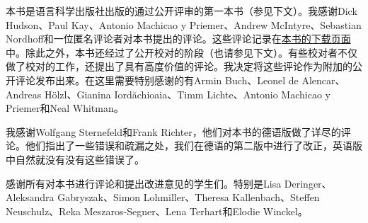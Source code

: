 
本书是语言科学出版社出版的通过公开评审的第一本书（参见下文）。我感谢Dick Hudson、Paul Kay、Antonio Machicao y Priemer、Andrew McIntyre、Sebastian Nordhoff和一位匿名评论者对本书提出的评论。这些评论记录在\href{\lsURL}{本书的下载页面}中。除此之外，本书还经过了公开校对的阶段（也请参见下文）。有些校对者不仅做了校对的工作，还提出了具有高度价值的评论。我决定将这些评论作为附加的公开评论发布出来。在这里需要特别感谢的有Armin Buch、Leonel de Alencar、Andreas Hölzl、Gianina Iordăchioaia、Timm Lichte、Antonio Machicao y Priemer和Neal Whitman。

我感谢Wolfgang Sternefeld和Frank Richter，他们对本书的德语版做了详尽的评论。他们指出了一些错误和疏漏之处，我们在德语的第二版中进行了改正，英语版中自然就没有没有这些错误了。

感谢所有对本书进行评论和提出改进意见的学生们。特别是Lisa Deringer、Aleksandra Gabryszak、Simon Lohmiller、Theresa Kallenbach、Steffen Neu\-schulz、Reka Meszaros-Segner、Lena Terhart和Elodie Winckel。

